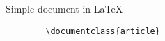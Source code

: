 

\begin{frame}[fragile]{Simple document in \LaTeX}
	\begin{verbatim} 
		\documentclass{article}


		
		
		




		
	\end{verbatim}

\end{frame}
